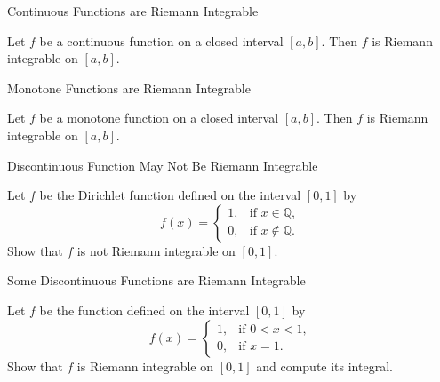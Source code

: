 \documentclass[12pt,a4paper]{article}
\begin{document}
\FrontPage
\Large

\begin{heading}
    Continuous Functions are Riemann Integrable
\end{heading}

\vspace{10pt}

\begin{theorem}
    Let $f$ be a continuous function on a closed interval $[a,b]$. Then $f$ is Riemann integrable on $[a,b]$.
\end{theorem}

\clearpage\begin{heading}
    Monotone Functions are Riemann Integrable
\end{heading}

\vspace{10pt}

\begin{theorem}
    Let $f$ be a monotone function on a closed interval $[a,b]$. Then $f$ is Riemann integrable on $[a,b]$.
\end{theorem}

\clearpage


\begin{heading}
    Discontinuous Function May Not Be Riemann Integrable
\end{heading}

\vspace{10pt}

\begin{problem}
    Let $f$ be the Dirichlet function defined on the interval $[0,1]$ by
    \[
        f(x) = 
        \begin{cases}
            1, & \text{if } x \in \mathbb{Q},\\
            0, & \text{if } x \notin  \mathbb{Q}.
        \end{cases}
    \]
    Show that $f$ is not Riemann integrable on $[0,1]$.
    
\end{problem}

\clearpage

\begin{heading}
    Some Discontinuous Functions are Riemann Integrable
\end{heading}


\begin{theorem}
    Let $f$ be the function defined on the interval $[0,1]$ by
    \[
        f(x) = 
        \begin{cases}
            1, & \text{if } 0 < x < 1,\\
            0, & \text{if } x = 1.
        \end{cases}
    \]
    Show that $f$ is Riemann integrable on $[0,1]$ and compute its integral.
\end{theorem}
\end{document}
